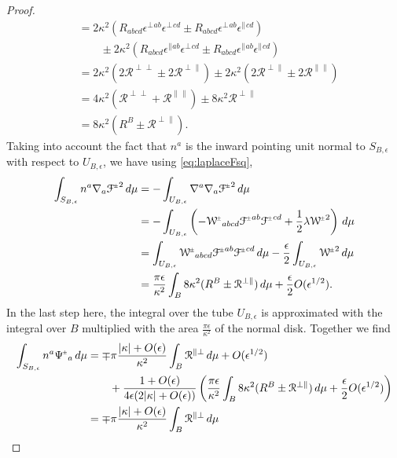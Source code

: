 \documentclass[a4paper,10pt,reqno]{amsart}
\newcommand{\bolt}{B}
\newcommand{\cR}{\mathcal{R}}
\theoremstyle{plain}
\newcommand{\PM}[1]{{{#1}^{\hspace{-.5pt}\scaleto{\pm}{3.5pt}}}}
\newcommand{\eps}{\epsilon}
\def\Wcal{\mathcal{W}}
\def\Fcal{\mathcal{F}}
\numberwithin{equation}{section}
\begin{document}
\begin{proof}
\begin{align}
&= 
2\kappa^2 
( R_{abcd}\eps^\perp{}^{ab} \eps^\perp{}^{cd} 
\pm R_{abcd}\eps^\perp{}^{ab} \eps^\parallel{}^{cd} ) \nonumber \\
&\qquad 
\pm 2\kappa^2 
( R_{abcd}\eps^\parallel{}^{ab} \eps^\perp{}^{cd} 
\pm R_{abcd}\eps^\parallel{}^{ab} \eps^\parallel{}^{cd} ) \nonumber \\
&=
2\kappa^2 
( 2\cR^{\perp\perp} \pm 2\cR^{\perp\parallel} ) 
\pm 2\kappa^2 
( 2\cR^{\perp\parallel} \pm 2\cR^{\parallel\parallel} ) \nonumber \\
&=
4\kappa^2 (\cR^{\perp\perp} + \cR^{\parallel\parallel} )
\pm 8\kappa^2 \cR^{\perp\parallel} \nonumber \\
&=
8\kappa^2 ( R^\bolt \pm \cR^{\perp\parallel} ). 
\end{align}
Taking into account the fact that $n^a$ is the inward pointing unit normal to $S_{\bolt,\eps}$ with respect to $U_{\bolt,\eps}$, we have using 
\eqref{eq:laplaceFsq}, 
\begin{align}
\int_{S_{\bolt,\epsilon}} n^a \nabla_a \PM{\Fcal}^2 \, d\mu
&=
-\int_{U_{\bolt,\epsilon}} \nabla^a \nabla_a \PM{\Fcal}^2 \, d\mu \nonumber \\
&=
-\int_{U_{\bolt,\epsilon}}
\left(
- \PM{\Wcal}_{abcd} \PM{\Fcal}^{ab} \PM{\Fcal}^{cd}
+ \frac{1}{2} \lambda  \PM{\Wcal}^2 
\right)
\, d\mu \nonumber \\
&=
\int_{U_{\bolt,\epsilon}}
\PM{\Wcal}_{abcd} \PM{\Fcal}^{ab} \PM{\Fcal}^{cd} \, d\mu
- \frac{\epsilon}{2}
\int_{U_{\bolt,\epsilon}}  \PM{\Wcal}^2  \, d\mu \nonumber \\
&=
\frac{\pi \eps}{ \kappa^2}
\int_\bolt 
8\kappa^2 ( R^\bolt \pm \cR^{\perp\parallel} ) \, d\mu
+ \frac{\epsilon}{2} O(\epsilon^{1/2}).
\end{align}
In the last step here, the integral over the tube $U_{\bolt,\epsilon}$ is approximated with the integral over $\bolt$ multiplied with the area $\frac{\pi \eps}{ \kappa^2}$ of the normal disk. Together we find 
\begin{align}
\int_{S_{\bolt,\epsilon}} n^a \PM\Psi_a \, d\mu
&=
\mp \pi\frac{|\kappa| + O(\epsilon)}{\kappa^2} 
\int_\bolt \cR^{\parallel\perp} \, d\mu
+ O(\epsilon^{1/2})
\nonumber \\
&\qquad
+\frac{1 + O(\epsilon)}{4\epsilon (2|\kappa| + O(\epsilon) )} 
\left(
\frac{\pi \eps}{ \kappa^2}
\int_\bolt
8\kappa^2 ( R^\bolt \pm \cR^{\perp\parallel} ) \, d\mu
+ \frac{\epsilon}{2} O(\epsilon^{1/2})
\right) \nonumber \\
&=
\mp \pi\frac{|\kappa| + O(\epsilon)}{\kappa^2} \int_\bolt \cR^{\parallel\perp} \, d\mu

\end{align}
\end{proof}
\end{document}
